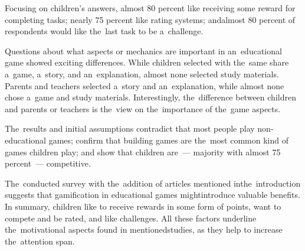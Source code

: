 \pagebreak
Focusing on children's answers, almost 80 percent like receiving some \mbox{reward} for completing tasks; nearly 75 percent like rating systems; and\linebreak{}almost 80 percent of respondents would like the~last task to be a~challenge.

Questions about what aspects or mechanics are important in an~educational game showed exciting differences.
While children selected with the~same share a~game, a~story, and an~explanation, almost none selected study materials.
Parents and teachers selected a~story and an~explanation, while almost none chose a~game and study materials.
Interestingly, the~difference between children and parents or teachers is the~view on the~importance of the~game aspects.

The~results and initial assumptions contradict that most people play non-educational games; confirm that building games are the~most common kind of games children play; and show that children are~--- majority with almost 75 percent~--- competitive. 

The~conducted survey with the~addition of articles mentioned in\linebreak{}the~introduction suggests that gamification in educational games might\linebreak{}introduce valuable benefits.
In summary, children like to receive rewards in some form of points, want to compete and be rated, and like challenges.
\linebreak{}All these factors underline the~motivational aspects found in mentioned\linebreak{}studies,
as they help to increase the~attention span.
